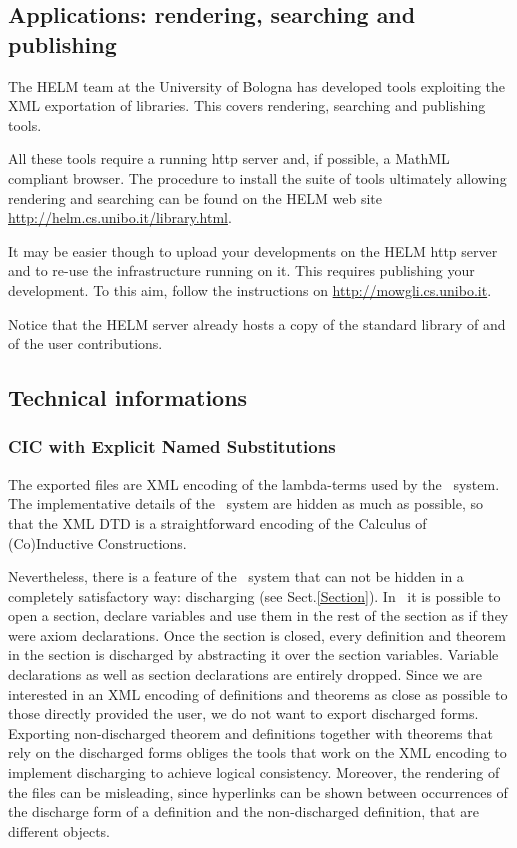 \subsection{Applications: rendering, searching and publishing}

The HELM team at the University of Bologna has developed tools
exploiting the XML exportation of {\Coq} libraries. This covers
rendering, searching and publishing tools.

All these tools require a running http server and, if possible, a
MathML compliant browser.  The procedure to install the suite of tools
ultimately allowing rendering and searching can be found on the HELM
web site \url{http://helm.cs.unibo.it/library.html}.

It may be easier though to upload your developments on the HELM http
server and to re-use the infrastructure running on it. This requires
publishing your development. To this aim, follow the instructions on
\url{http://mowgli.cs.unibo.it}.

Notice that the HELM server already hosts a copy of the standard
library of {\Coq} and of the {\Coq} user contributions.

\subsection{Technical informations}

\subsubsection{CIC with Explicit Named Substitutions}
                                                                               
The exported files are XML encoding of the lambda-terms used by the
\Coq\ system. The implementative details of the \Coq\ system are hidden as much
as possible, so that the XML DTD is a straightforward encoding of the
Calculus of (Co)Inductive Constructions.
                                                                                
Nevertheless, there is a feature of the \Coq\ system that can not be
hidden in a completely satisfactory way: discharging (see Sect.\ref{Section}).
In \Coq\ it is possible
to open a section, declare variables and use them in the rest of the section
as if they were axiom declarations. Once the section is closed, every definition and theorem in the section is discharged by abstracting it over the section
variables. Variable declarations as well as section declarations are entirely
dropped. Since we are interested in an XML encoding of definitions and
theorems as close as possible to those directly provided the user, we
do not want to export discharged forms. Exporting non-discharged theorem
and definitions together with theorems that rely on the discharged forms
obliges the tools that work on the XML encoding to implement discharging to
achieve logical consistency. Moreover, the rendering of the files can be
misleading, since hyperlinks can be shown between occurrences of the discharge
form of a definition and the non-discharged definition, that are different
objects.
                                                                                
